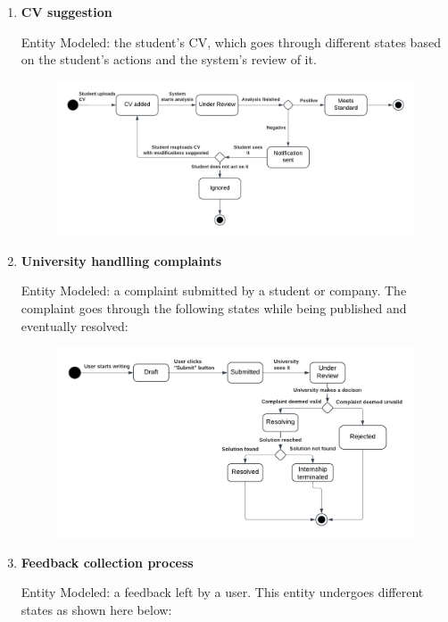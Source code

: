 \begin{enumerate}
\item \textbf{CV suggestion}

Entity Modeled: the student’s CV, which goes through different states based on the student's actions and the system's review of it.

\begin{figure}[H]
    \centering
    \includegraphics[width=1\linewidth]{RASD//Images/CV.png}
    \caption{}
    \label{fig:enter-label}
\end{figure}

\item \textbf{University handlling complaints}

Entity Modeled: a complaint submitted by a student or company. The complaint goes through the following states while being published and eventually resolved:

\begin{figure}[H]
    \centering
    \includegraphics[width=1\linewidth]{RASD//Images/Complaints.png}
    \caption{}
    \label{fig:enter-label}
\end{figure}


\item \textbf{Feedback collection process}

Entity Modeled: a feedback left by a user. This entity undergoes different states as shown here below: 


\end{enumerate}
